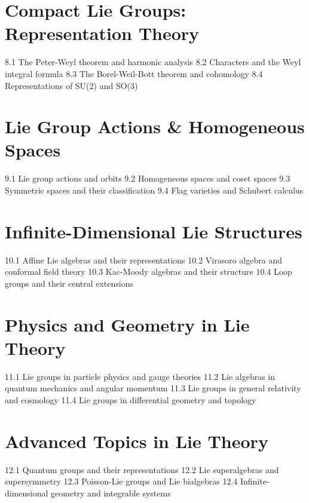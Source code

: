 \section{Compact Lie Groups: Representation Theory}
8.1 The Peter-Weyl theorem and harmonic analysis
8.2 Characters and the Weyl integral formula
8.3 The Borel-Weil-Bott theorem and cohomology
8.4 Representations of SU(2) and SO(3)
\section{Lie Group Actions \& Homogeneous Spaces}
9.1 Lie group actions and orbits
9.2 Homogeneous spaces and coset spaces
9.3 Symmetric spaces and their classification
9.4 Flag varieties and Schubert calculus
\section{Infinite-Dimensional Lie Structures}
10.1 Affine Lie algebras and their representations
10.2 Virasoro algebra and conformal field theory
10.3 Kac-Moody algebras and their structure
10.4 Loop groups and their central extensions
\section{Physics and Geometry in Lie Theory}
11.1 Lie groups in particle physics and gauge theories
11.2 Lie algebras in quantum mechanics and angular momentum
11.3 Lie groups in general relativity and cosmology
11.4 Lie groups in differential geometry and topology
\section{Advanced Topics in Lie Theory}
12.1 Quantum groups and their representations
12.2 Lie superalgebras and supersymmetry
12.3 Poisson-Lie groups and Lie bialgebras
12.4 Infinite-dimensional geometry and integrable systems
